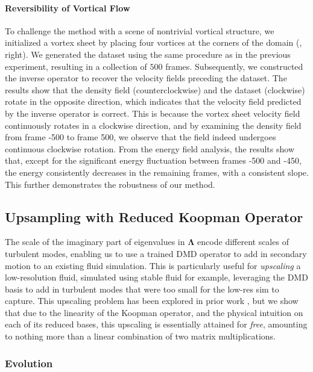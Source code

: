 \paragraph{Reversibility of Vortical Flow}
To challenge the method with a scene of nontrivial vortical structure, we initialized a vortex sheet by placing four vortices at the corners of the domain (, right). We generated the dataset using the same procedure as in the previous experiment, resulting in a collection of $500$ frames. Subsequently, we constructed the inverse operator to recover the velocity fields preceding the dataset.
The results show that the density field (counterclockwise) and the dataset (clockwise) rotate in the opposite direction, which indicates that the velocity field predicted by the inverse operator is correct. This is because the vortex sheet velocity field continuously rotates in a clockwise direction, and by examining the density field from frame -500 to frame 500, we observe that the field indeed undergoes continuous clockwise rotation.
From the energy field analysis, the results show that, except for the significant energy fluctuation between frames -500 and -450, the energy consistently decreases in the remaining frames, with a consistent slope. This further demonstrates the robustness of our method.

\subsection{Upsampling with Reduced Koopman Operator}

The scale of the imaginary part of eigenvalues in $\bm{\Lambda}$ encode different scales of turbulent modes, enabling us to use a trained DMD operator to add in secondary motion to an existing fluid simulation. This is particularly useful for \emph{upscaling} a low-resolution fluid, simulated using stable fluid for example, leveraging the DMD basis to add in turbulent modes that were too small for the low-res sim to capture. This upscaling problem has been explored in prior work \cite{kim2008wavelet, nielsen2009guiding}, but we show that due to the linearity of the Koopman operator, and the physical intuition on each of its reduced bases, this upscaling is essentially attained for \emph{free}, amounting to nothing more than a linear combination of two matrix multiplications. 

\subsubsection{Evolution} \label{sec:upres_direct}

